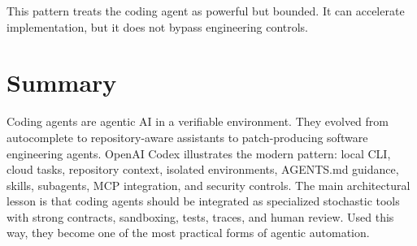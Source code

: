 This pattern treats the coding agent as powerful but bounded. It can accelerate implementation, but it does not bypass engineering controls.

\section{Summary}

Coding agents are agentic AI in a verifiable environment. They evolved from autocomplete to repository-aware assistants to patch-producing software engineering agents. OpenAI Codex illustrates the modern pattern: local CLI, cloud tasks, repository context, isolated environments, AGENTS.md guidance, skills, subagents, MCP integration, and security controls. The main architectural lesson is that coding agents should be integrated as specialized stochastic tools with strong contracts, sandboxing, tests, traces, and human review. Used this way, they become one of the most practical forms of agentic automation.
